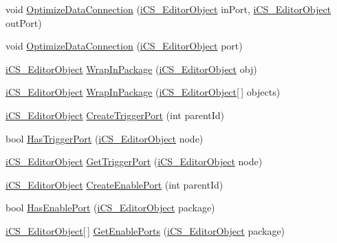 \begin{DoxyCompactItemize}
\item 
void \hyperlink{classi_c_s___i_storage_a03a59e7dcc74e06911918011aa948950}{Optimize\+Data\+Connection} (\hyperlink{classi_c_s___editor_object}{i\+C\+S\+\_\+\+Editor\+Object} in\+Port, \hyperlink{classi_c_s___editor_object}{i\+C\+S\+\_\+\+Editor\+Object} out\+Port)
\item 
void \hyperlink{classi_c_s___i_storage_a6e071ab2f0802b99d1acf3afbcd4304a}{Optimize\+Data\+Connection} (\hyperlink{classi_c_s___editor_object}{i\+C\+S\+\_\+\+Editor\+Object} port)
\item 
\hyperlink{classi_c_s___editor_object}{i\+C\+S\+\_\+\+Editor\+Object} \hyperlink{classi_c_s___i_storage_a0d74afb51992c00c688b3ebc71d56567}{Wrap\+In\+Package} (\hyperlink{classi_c_s___editor_object}{i\+C\+S\+\_\+\+Editor\+Object} obj)
\item 
\hyperlink{classi_c_s___editor_object}{i\+C\+S\+\_\+\+Editor\+Object} \hyperlink{classi_c_s___i_storage_a30b7e3fbc794d1b6df5908729150a333}{Wrap\+In\+Package} (\hyperlink{classi_c_s___editor_object}{i\+C\+S\+\_\+\+Editor\+Object}\mbox{[}$\,$\mbox{]} objects)
\item 
\hyperlink{classi_c_s___editor_object}{i\+C\+S\+\_\+\+Editor\+Object} \hyperlink{classi_c_s___i_storage_a6618d2b43c5f75ef4a89efeea1038b80}{Create\+Trigger\+Port} (int parent\+Id)
\item 
bool \hyperlink{classi_c_s___i_storage_a4e16f81e0f93c3acb584ffac9386d578}{Has\+Trigger\+Port} (\hyperlink{classi_c_s___editor_object}{i\+C\+S\+\_\+\+Editor\+Object} node)
\item 
\hyperlink{classi_c_s___editor_object}{i\+C\+S\+\_\+\+Editor\+Object} \hyperlink{classi_c_s___i_storage_a7df7764d8fd54874572b4cc013cd51ac}{Get\+Trigger\+Port} (\hyperlink{classi_c_s___editor_object}{i\+C\+S\+\_\+\+Editor\+Object} node)
\item 
\hyperlink{classi_c_s___editor_object}{i\+C\+S\+\_\+\+Editor\+Object} \hyperlink{classi_c_s___i_storage_a9174effcfa711c8c9ec6a53e8d57fdb7}{Create\+Enable\+Port} (int parent\+Id)
\item 
bool \hyperlink{classi_c_s___i_storage_abf87038125115eb73b670397f11dafc9}{Has\+Enable\+Port} (\hyperlink{classi_c_s___editor_object}{i\+C\+S\+\_\+\+Editor\+Object} package)
\item 
\hyperlink{classi_c_s___editor_object}{i\+C\+S\+\_\+\+Editor\+Object}\mbox{[}$\,$\mbox{]} \hyperlink{classi_c_s___i_storage_a7d971b653f614454d58570288b0100b2}{Get\+Enable\+Ports} (\hyperlink{classi_c_s___editor_object}{i\+C\+S\+\_\+\+Editor\+Object} package)

\end{DoxyCompactItemize}
